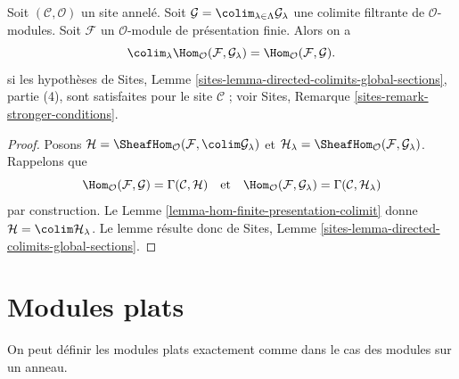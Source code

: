 \begin{lemma}
\label{lemma-finite-presentation-quasi-compact-colimit}
Soit $(\mathcal{C}, \mathcal{O})$ un site annelé.
Soit $\mathcal{G} = \colim_{\lambda \in \Lambda} \mathcal{G}_\lambda$ une
colimite filtrante de $\mathcal{O}$-modules.
Soit $\mathcal{F}$ un $\mathcal{O}$-module de présentation finie.
Alors on a
$$
\colim_\lambda \Hom_\mathcal{O}(\mathcal{F}, \mathcal{G}_\lambda)
=
\Hom_\mathcal{O}(\mathcal{F}, \mathcal{G}).
$$
si les hypothèses de Sites, Lemme
\ref{sites-lemma-directed-colimits-global-sections}, partie (4), sont
satisfaites pour le site $\mathcal{C}$ ; voir Sites, Remarque
\ref{sites-remark-stronger-conditions}.
\end{lemma}

\begin{proof}
Posons $\mathcal{H} =
\SheafHom_\mathcal{O}(\mathcal{F}, \colim \mathcal{G}_\lambda)$
et $\mathcal{H}_\lambda =
\SheafHom_\mathcal{O}(\mathcal{F}, \mathcal{G}_\lambda)$.
Rappelons que
$$
\Hom_\mathcal{O}(\mathcal{F}, \mathcal{G}) = \Gamma(\mathcal{C}, \mathcal{H})
\quad\text{et}\quad
\Hom_\mathcal{O}(\mathcal{F}, \mathcal{G}_\lambda) =
\Gamma(\mathcal{C}, \mathcal{H}_\lambda)
$$
par construction. Le Lemme \ref{lemma-hom-finite-presentation-colimit} donne
$\mathcal{H} = \colim \mathcal{H}_\lambda$. Le lemme résulte donc de Sites,
Lemme \ref{sites-lemma-directed-colimits-global-sections}.
\end{proof}
\section{Modules plats}

\label{section-flat}

\noindent
On peut définir les modules plats exactement comme dans le cas des modules sur un anneau.

